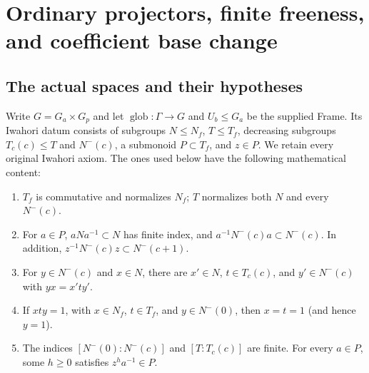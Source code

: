 \section{Ordinary projectors, finite freeness, and coefficient base change}
\label{sec:ordinary-structure-v42}


\subsection{The actual spaces and their hypotheses}

Write $G=G_a\times G_p$ and let $\operatorname{glob}:\Gamma\to G$
and $U_b\leq G_a$ be the supplied Frame.  Its Iwahori datum consists of
subgroups $N\leq N_f$, $T\leq T_f$, decreasing subgroups
$T_c(c)\leq T$ and $N^-(c)$, a submonoid $P\subset T_f$, and
$z\in P$.  We retain every original Iwahori axiom.  The ones used
below have the following mathematical content:

\begin{enumerate}
\item $T_f$ is commutative and normalizes $N_f$; $T$ normalizes
both $N$ and every $N^-(c)$.
\item For $a\in P$, $aNa^{-1}\subset N$ has finite index, and
$a^{-1}N^-(c)a\subset N^-(c)$.  In addition,
$z^{-1}N^-(c)z\subset N^-(c+1)$.
\item For $y\in N^-(c)$ and $x\in N$, there are
$x'\in N$, $t\in T_c(c)$, and $y'\in N^-(c)$ with
$yx=x'ty'$.
\item If $xty=1$, with $x\in N_f$, $t\in T_f$, and
$y\in N^-(0)$, then $x=t=1$ (and hence $y=1$).
\item The indices $[N^-(0):N^-(c)]$ and $[T:T_c(c)]$ are
finite.  For every $a\in P$, some $h\geq0$ satisfies
$z^h a^{-1}\in P$.
\end{enumerate}

